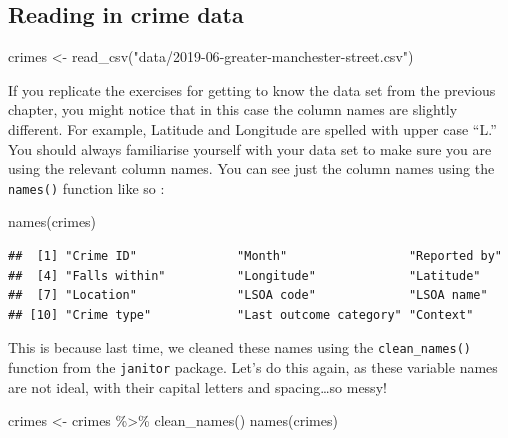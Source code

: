 \documentclass[
]{book}
\newenvironment{Shaded}{\begin{snugshade}}{\end{snugshade}}
\newcommand{\FunctionTok}[1]{\textcolor[rgb]{0.00,0.00,0.00}{#1}}
\newcommand{\NormalTok}[1]{#1}
\newcommand{\OtherTok}[1]{\textcolor[rgb]{0.56,0.35,0.01}{#1}}
\newcommand{\SpecialCharTok}[1]{\textcolor[rgb]{0.00,0.00,0.00}{#1}}
\newcommand{\StringTok}[1]{\textcolor[rgb]{0.31,0.60,0.02}{#1}}
\begin{document}
\hypertarget{reading-in-crime-data}{%
\subsection{Reading in crime data}\label{reading-in-crime-data}}

\begin{Shaded}
\begin{Highlighting}[]
\NormalTok{crimes }\OtherTok{\textless{}{-}} \FunctionTok{read\_csv}\NormalTok{(}\StringTok{"data/2019{-}06{-}greater{-}manchester{-}street.csv"}\NormalTok{)}
\end{Highlighting}
\end{Shaded}

If you replicate the exercises for getting to know the data set from the previous chapter, you might notice that in this case the column names are slightly different. For example, Latitude and Longitude are spelled with upper case ``L.'' You should always familiarise yourself with your data set to make sure you are using the relevant column names. You can see just the column names using the \texttt{names()} function like so :

\begin{Shaded}
\begin{Highlighting}[]
\FunctionTok{names}\NormalTok{(crimes)}
\end{Highlighting}
\end{Shaded}

\begin{verbatim}
##  [1] "Crime ID"              "Month"                 "Reported by"          
##  [4] "Falls within"          "Longitude"             "Latitude"             
##  [7] "Location"              "LSOA code"             "LSOA name"            
## [10] "Crime type"            "Last outcome category" "Context"
\end{verbatim}

This is because last time, we cleaned these names using the \texttt{clean\_names()} function from the \texttt{janitor} package. Let's do this again, as these variable names are not ideal, with their capital letters and spacing\ldots so messy!

\begin{Shaded}
\begin{Highlighting}[]
\NormalTok{crimes }\OtherTok{\textless{}{-}}\NormalTok{ crimes }\SpecialCharTok{\%\textgreater{}\%} 
  \FunctionTok{clean\_names}\NormalTok{()}
\FunctionTok{names}\NormalTok{(crimes)}
\end{Highlighting}
\end{Shaded}
\end{document}
